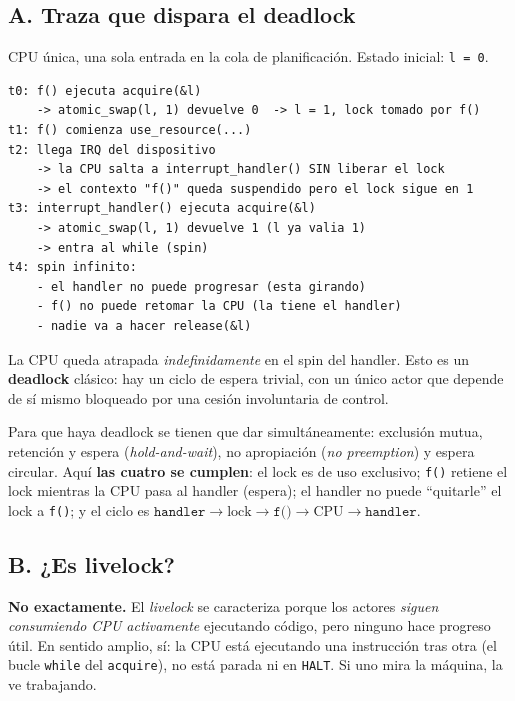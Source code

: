 \documentclass[11pt,a4paper]{article}
\begin{document}
\subsection*{A. Traza que dispara el deadlock}

CPU única, una sola entrada en la cola de planificación. Estado
inicial: \texttt{l = 0}.

\begin{lstlisting}[style=textstyle]
t0: f() ejecuta acquire(&l)
    -> atomic_swap(l, 1) devuelve 0  -> l = 1, lock tomado por f()
t1: f() comienza use_resource(...)
t2: llega IRQ del dispositivo
    -> la CPU salta a interrupt_handler() SIN liberar el lock
    -> el contexto "f()" queda suspendido pero el lock sigue en 1
t3: interrupt_handler() ejecuta acquire(&l)
    -> atomic_swap(l, 1) devuelve 1 (l ya valia 1)
    -> entra al while (spin)
t4: spin infinito:
    - el handler no puede progresar (esta girando)
    - f() no puede retomar la CPU (la tiene el handler)
    - nadie va a hacer release(&l)
\end{lstlisting}

La CPU queda atrapada \emph{indefinidamente} en el spin del handler.
Esto es un \textbf{deadlock} clásico: hay un ciclo de espera trivial,
con un único actor que depende de sí mismo bloqueado por una cesión
involuntaria de control.

\begin{idea}
Para que haya deadlock se tienen que dar simultáneamente:
exclusión mutua, retención y espera (\emph{hold-and-wait}),
no apropiación (\emph{no preemption}) y espera circular. Aquí
\textbf{las cuatro se cumplen}: el lock es de uso exclusivo;
\texttt{f()} retiene el lock mientras la CPU pasa al handler (espera);
el handler no puede ``quitarle'' el lock a \texttt{f()}; y el ciclo es
$\texttt{handler} \to \text{lock} \to \texttt{f()} \to \text{CPU} \to
\texttt{handler}$.
\end{idea}

\subsection*{B. ¿Es livelock?}

\textbf{No exactamente.} El \emph{livelock} se caracteriza porque los
actores \emph{siguen consumiendo CPU activamente} ejecutando código,
pero ninguno hace progreso útil. En sentido amplio, sí: la CPU está
ejecutando una instrucción tras otra (el bucle \texttt{while} del
\texttt{acquire}), no está parada ni en \texttt{HALT}. Si uno mira la
máquina, la ve trabajando.
\end{document}
